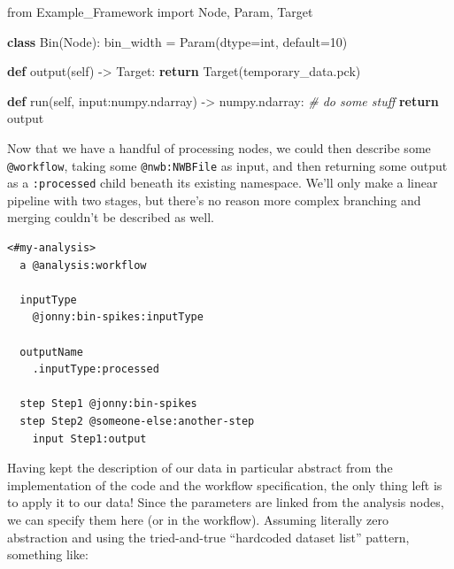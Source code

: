 \documentclass[notoc]{tufte-book}
\newenvironment{Shaded}{}{}
\newcommand{\BuiltInTok}[1]{#1}
\newcommand{\CommentTok}[1]{\textcolor[rgb]{0.38,0.63,0.69}{\textit{#1}}}
\newcommand{\ControlFlowTok}[1]{\textcolor[rgb]{0.00,0.44,0.13}{\textbf{#1}}}
\newcommand{\DecValTok}[1]{\textcolor[rgb]{0.25,0.63,0.44}{#1}}
\newcommand{\ImportTok}[1]{#1}
\newcommand{\KeywordTok}[1]{\textcolor[rgb]{0.00,0.44,0.13}{\textbf{#1}}}
\newcommand{\NormalTok}[1]{#1}
\newcommand{\OperatorTok}[1]{\textcolor[rgb]{0.40,0.40,0.40}{#1}}
\newcommand{\StringTok}[1]{\textcolor[rgb]{0.25,0.44,0.63}{#1}}
\newcommand{\VariableTok}[1]{\textcolor[rgb]{0.10,0.09,0.49}{#1}}
\begin{document}
\begin{Shaded}
\begin{Highlighting}[]
\ImportTok{from}\NormalTok{ Example\_Framework }\ImportTok{import}\NormalTok{ Node, Param, Target}

\KeywordTok{class}\NormalTok{ Bin(Node):}
\NormalTok{  bin\_width }\OperatorTok{=}\NormalTok{ Param(dtype}\OperatorTok{=}\BuiltInTok{int}\NormalTok{, default}\OperatorTok{=}\DecValTok{10}\NormalTok{)}

  \KeywordTok{def}\NormalTok{ output(}\VariableTok{self}\NormalTok{) }\OperatorTok{{-}\textgreater{}}\NormalTok{ Target:}
    \ControlFlowTok{return}\NormalTok{ Target(}\StringTok{\textquotesingle{}temporary\_data.pck\textquotesingle{}}\NormalTok{)}

  \KeywordTok{def}\NormalTok{ run(}\VariableTok{self}\NormalTok{, }\BuiltInTok{input}\NormalTok{:}\StringTok{\textquotesingle{}numpy.ndarray\textquotesingle{}}\NormalTok{) }\OperatorTok{{-}\textgreater{}} \StringTok{\textquotesingle{}numpy.ndarray\textquotesingle{}}\NormalTok{:}
    \CommentTok{\# do some stuff}
    \ControlFlowTok{return}\NormalTok{ output}
\end{Highlighting}
\end{Shaded}

Now that we have a handful of processing nodes, we could then describe
some \texttt{@workflow}, taking some \texttt{@nwb:NWBFile} as input, and
then returning some output as a \texttt{:processed} child beneath its
existing namespace. We'll only make a linear pipeline with two stages,
but there's no reason more complex branching and merging couldn't be
described as well.

\begin{verbatim}
<#my-analysis>
  a @analysis:workflow

  inputType 
    @jonny:bin-spikes:inputType

  outputName
    .inputType:processed

  step Step1 @jonny:bin-spikes
  step Step2 @someone-else:another-step
    input Step1:output
\end{verbatim}

Having kept the description of our data in particular abstract from the
implementation of the code and the workflow specification, the only
thing left is to apply it to our data! Since the parameters are linked
from the analysis nodes, we can specify them here (or in the workflow).
Assuming literally zero abstraction and using the tried-and-true
``hardcoded dataset list'' pattern, something like:
\end{document}
